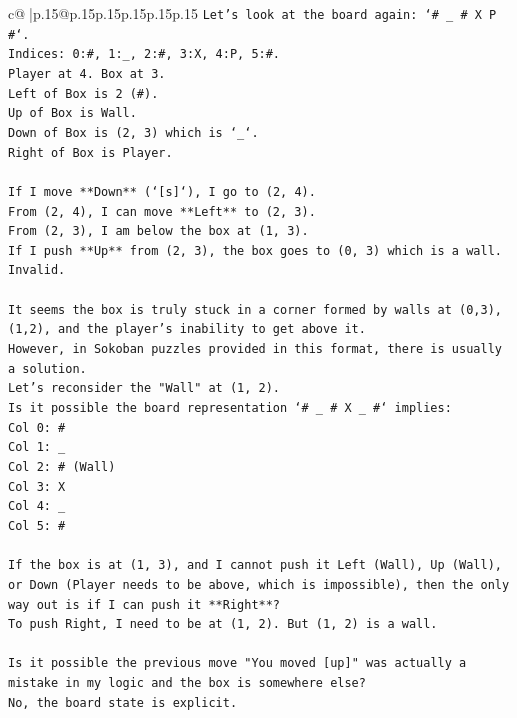 \documentclass{article}
\begin{document}
{\begin{supertabular}{c@{$\;$}|p{.15\linewidth}@{}p{.15\linewidth}p{.15\linewidth}p{.15\linewidth}p{.15\linewidth}p{.15\linewidth}}
{{{\texttt{Let's look at the board again: `\# \_ \# X P \#`.} \\
\texttt{Indices: 0:\#, 1:\_, 2:\#, 3:X, 4:P, 5:\#.} \\
\texttt{Player at 4. Box at 3.} \\
\texttt{Left of Box is 2 (\#).} \\
\texttt{Up of Box is Wall.} \\
\texttt{Down of Box is (2, 3) which is `\_`.} \\
\texttt{Right of Box is Player.} \\
\\ 
\texttt{If I move **Down** (`{[}s{]}`), I go to (2, 4).} \\
\texttt{From (2, 4), I can move **Left** to (2, 3).} \\
\texttt{From (2, 3), I am below the box at (1, 3).} \\
\texttt{If I push **Up** from (2, 3), the box goes to (0, 3) which is a wall. Invalid.} \\
\\ 
\texttt{It seems the box is truly stuck in a corner formed by walls at (0,3), (1,2), and the player's inability to get above it.} \\
\texttt{However, in Sokoban puzzles provided in this format, there is usually a solution.} \\
\texttt{Let's reconsider the "Wall" at (1, 2).} \\
\texttt{Is it possible the board representation `\# \_ \# X \_ \#` implies:} \\
\texttt{Col 0: \#} \\
\texttt{Col 1: \_} \\
\texttt{Col 2: \# (Wall)} \\
\texttt{Col 3: X} \\
\texttt{Col 4: \_} \\
\texttt{Col 5: \#} \\
\\ 
\texttt{If the box is at (1, 3), and I cannot push it Left (Wall), Up (Wall), or Down (Player needs to be above, which is impossible), then the only way out is if I can push it **Right**?} \\
\texttt{To push Right, I need to be at (1, 2). But (1, 2) is a wall.} \\
\\ 
\texttt{Is it possible the previous move "You moved {[}up{]}" was actually a mistake in my logic and the box is somewhere else?} \\
\texttt{No, the board state is explicit.} \\
}}}
\end{supertabular}}
\end{document}
